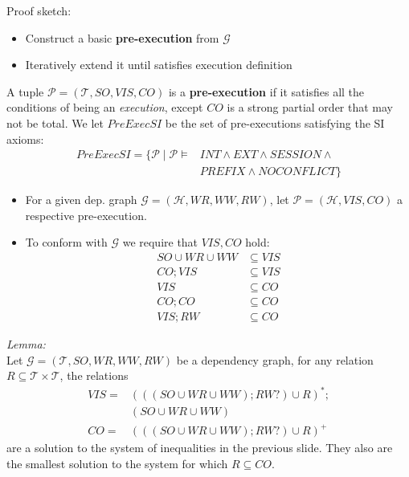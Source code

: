 \documentclass{beamer}
\begin{document}
\begin{frame}
Proof sketch: \\

\begin{itemize}
	\item Construct a basic \textbf{pre-execution} from $\mathcal{G}$
	\item Iteratively extend it until satisfies execution definition
\end{itemize}

\end{frame}

\begin{frame}
	A tuple $\mathcal{P} = (\mathcal{T}, SO, VIS, CO) $ is a \textbf{pre-execution} if it satisfies all the conditions of being an \emph{execution}, except $CO$ is a strong partial order that may not be total. We let $PreExecSI$ be the set of pre-executions satisfying the SI axioms:
	$$
		\begin{aligned}
			PreExecSI = \{ \mathcal{P} \mid \mathcal{P} \vDash & INT \wedge EXT \wedge SESSION \wedge \\
															   & PREFIX \wedge NOCONFLICT \}
		\end{aligned}
	$$
\end{frame}

\begin{frame}
	\begin{itemize}
		\item For a given dep. graph $\mathcal{G} = (\mathcal{H}, WR, WW, RW)$, let $\mathcal{P} = (\mathcal{H}, VIS, CO)$ a respective pre-execution.
		\item To conform with $\mathcal{G}$ we require that $VIS,CO$ hold: \\
			\begin{align}
				SO \cup WR \cup WW & \subseteq VIS \\
				CO; VIS & \subseteq VIS \\
				VIS & \subseteq CO \\
				CO; CO & \subseteq CO \\
				VIS; RW & \subseteq CO
			\end{align}
	\end{itemize}
\end{frame}

\begin{frame}
	\textit{Lemma:} \\
	Let $\mathcal{G} = (\mathcal{T}, SO, WR, WW, RW)$ be a dependency graph, for any relation $R \subseteq \mathcal{T} \times \mathcal{T}$, the relations
	$$
		\begin{aligned}
			VIS = {} & (((SO \cup WR \cup WW); RW?) \cup R)^*; \\
			         & (SO \cup WR \cup WW) \\
			 CO = {} & (((SO \cup WR \cup WW); RW?) \cup R)^+
		\end{aligned}
	$$
	are a solution to the system of inequalities in the previous slide. They also are the smallest solution to the system for which $R \subseteq CO$.
\end{frame}
\end{document}
